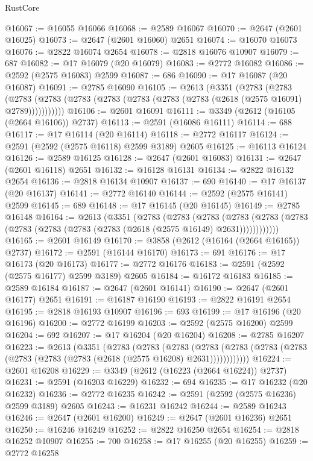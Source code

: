 \begin{lexlean}{RustCore}
\begin{coremodule}
@16067 := @16055 @16066
@16068 := @2589 @16067
@16070 := @2647 (@2601 @16025)
@16073 := @2647 (@2601 @16060) @2651
@16074 := @16070 @16073
@16076 := @2822 @16074 @2654
@16078 := @2818 @16076 @10907
@16079 := 687
@16082 := @17 @16079 (@20 @16079)
@16083 := @2772 @16082
@16086 := @2592 (@2575 @16083) @2599
@16087 := 686
@16090 := @17 @16087 (@20 @16087)
@16091 := @2785 @16090
@16105 := @2613
    (@3351
      (@2783
        (@2783
          (@2783 (@2783 (@2783 (@2783 (@2783 (@2783 (@2783 (@2618 (@2575 @16091) @2789)))))))))))
@16106 := @2601 @16091
@16111 := @3349 (@2612 (@16105 (@2664 @16106)) @2737)
@16113 := @2591 (@16086 @16111)
@16114 := 688
@16117 := @17 @16114 (@20 @16114)
@16118 := @2772 @16117
@16124 := @2591 (@2592 (@2575 @16118) @2599 @3189) @2605
@16125 := @16113 @16124
@16126 := @2589 @16125
@16128 := @2647 (@2601 @16083)
@16131 := @2647 (@2601 @16118) @2651
@16132 := @16128 @16131
@16134 := @2822 @16132 @2654
@16136 := @2818 @16134 @10907
@16137 := 690
@16140 := @17 @16137 (@20 @16137)
@16141 := @2772 @16140
@16144 := @2592 (@2575 @16141) @2599
@16145 := 689
@16148 := @17 @16145 (@20 @16145)
@16149 := @2785 @16148
@16164 := @2613
    (@3351
      (@2783
        (@2783
          (@2783
            (@2783 (@2783 (@2783 (@2783 (@2783 (@2783 (@2783 (@2618 (@2575 @16149) @2631))))))))))))
@16165 := @2601 @16149
@16170 := @3858 (@2612 (@16164 (@2664 @16165)) @2737)
@16172 := @2591 (@16144 @16170)
@16173 := 691
@16176 := @17 @16173 (@20 @16173)
@16177 := @2772 @16176
@16183 := @2591 (@2592 (@2575 @16177) @2599 @3189) @2605
@16184 := @16172 @16183
@16185 := @2589 @16184
@16187 := @2647 (@2601 @16141)
@16190 := @2647 (@2601 @16177) @2651
@16191 := @16187 @16190
@16193 := @2822 @16191 @2654
@16195 := @2818 @16193 @10907
@16196 := 693
@16199 := @17 @16196 (@20 @16196)
@16200 := @2772 @16199
@16203 := @2592 (@2575 @16200) @2599
@16204 := 692
@16207 := @17 @16204 (@20 @16204)
@16208 := @2785 @16207
@16223 := @2613
    (@3351
      (@2783
        (@2783
          (@2783
            (@2783 (@2783 (@2783 (@2783 (@2783 (@2783 (@2783 (@2618 (@2575 @16208) @2631))))))))))))
@16224 := @2601 @16208
@16229 := @3349 (@2612 (@16223 (@2664 @16224)) @2737)
@16231 := @2591 (@16203 @16229)
@16232 := 694
@16235 := @17 @16232 (@20 @16232)
@16236 := @2772 @16235
@16242 := @2591 (@2592 (@2575 @16236) @2599 @3189) @2605
@16243 := @16231 @16242
@16244 := @2589 @16243
@16246 := @2647 (@2601 @16200)
@16249 := @2647 (@2601 @16236) @2651
@16250 := @16246 @16249
@16252 := @2822 @16250 @2654
@16254 := @2818 @16252 @10907
@16255 := 700
@16258 := @17 @16255 (@20 @16255)
@16259 := @2772 @16258

\end{coremodule}
\end{lexlean}
